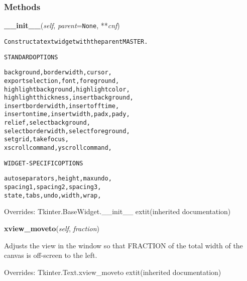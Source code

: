 
  \subsubsection{Methods}

    \vspace{0.5ex}

\hspace{.8\funcindent}\begin{boxedminipage}{\funcwidth}

    \raggedright \textbf{\_\_init\_\_}(\textit{self}, \textit{parent}={\tt None}, **\textit{cnf})

\setlength{\parskip}{2ex}
\begin{alltt}
Construct a text widget with the parent MASTER.

STANDARD OPTIONS

    background, borderwidth, cursor,
    exportselection, font, foreground,
    highlightbackground, highlightcolor,
    highlightthickness, insertbackground,
    insertborderwidth, insertofftime,
    insertontime, insertwidth, padx, pady,
    relief, selectbackground,
    selectborderwidth, selectforeground,
    setgrid, takefocus,
    xscrollcommand, yscrollcommand,

WIDGET-SPECIFIC OPTIONS

    autoseparators, height, maxundo,
    spacing1, spacing2, spacing3,
    state, tabs, undo, width, wrap,
\end{alltt}

\setlength{\parskip}{1ex}
      Overrides: Tkinter.BaseWidget.\_\_init\_\_ 	extit{(inherited documentation)}

    \end{boxedminipage}

    \vspace{0.5ex}

\hspace{.8\funcindent}\begin{boxedminipage}{\funcwidth}

    \raggedright \textbf{xview\_moveto}(\textit{self}, \textit{fraction})

\setlength{\parskip}{2ex}
    Adjusts the view in the window so that FRACTION of the total width of 
    the canvas is off-screen to the left.

\setlength{\parskip}{1ex}
      Overrides: Tkinter.Text.xview\_moveto 	extit{(inherited documentation)}

    \end{boxedminipage}


